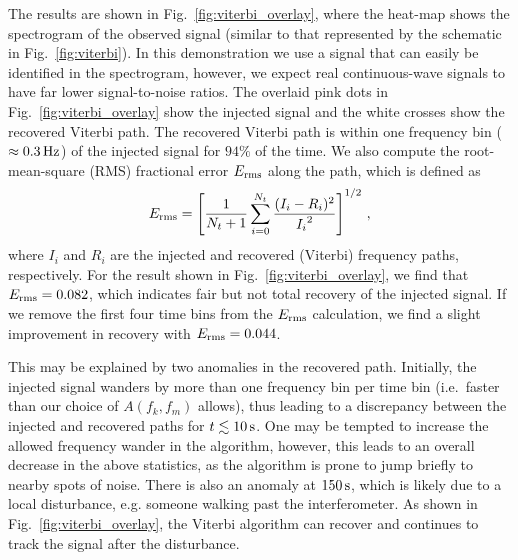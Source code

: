 \documentclass[paper-main.tex]{subfiles}
\begin{document}
The results are shown in Fig.~\ref{fig:viterbi_overlay}, where the heat-map shows the spectrogram of the observed signal (similar to that represented by the schematic in Fig.~\ref{fig:viterbi}). 
In this demonstration we use a signal that can easily be identified in the spectrogram, however, we expect real continuous-wave signals to have far lower signal-to-noise ratios. 
The overlaid pink dots in Fig.~\ref{fig:viterbi_overlay} show the injected signal and the white crosses show the recovered Viterbi path.
The recovered Viterbi path is within one frequency bin ($\approx 0.3\,{\rm Hz}$) of the injected signal for $94\%$ of the time. We also compute the root-mean-square (RMS) fractional error $E_{\rm rms}$ along the path, which is defined as 
\begin{equation}
E_{\rm rms} = \left[ \frac{1}{N_t+1} \sum_{i=0}^{N_t} \frac{(I_i - R_i)^2}{{I_i}^2} \right] ^{1/2}\,,
\end{equation}
where $I_i$ and $R_i$ are the injected and recovered (Viterbi) frequency paths, respectively. 
For the result shown in Fig.~\ref{fig:viterbi_overlay}, we find that $E_{\rm rms} = 0.082$, which indicates fair but not total recovery of the injected signal.
If we remove the first four time bins from the $E_{\rm rms}$ calculation, we find a slight improvement in recovery with $E_{\rm rms} = 0.044$.



This may be explained by two anomalies in the recovered path. Initially, the injected signal wanders by more than one frequency bin per time bin (i.e.\ faster than our choice of $A(f_k,f_m)$ allows), thus leading to a discrepancy between the injected and recovered paths for $t\lesssim 10\,{\rm s}$. One may be tempted to increase the allowed frequency wander in the algorithm, however, this leads to an overall decrease in the above statistics, as the algorithm is prone to jump briefly to nearby spots of noise. There is also an anomaly at $150\,{\rm s}$, which is likely due to a local disturbance, e.g. someone walking past the interferometer. 
As shown in Fig.~\ref{fig:viterbi_overlay}, the Viterbi algorithm can recover and continues to track the signal after the disturbance. 
\end{document}
